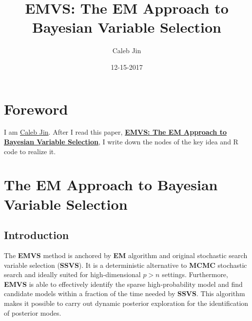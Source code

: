 \documentclass[]{book}
\title{EMVS: The EM Approach to Bayesian Variable Selection}
\author{Caleb Jin}
\date{12-15-2017}
\begin{document}
\maketitle

{
\setcounter{tocdepth}{1}
\tableofcontents
}
\hypertarget{foreword}{%
\chapter{Foreword}\label{foreword}}

I am \href{https://www.sjin.name/}{Caleb Jin}. After I read this paper, \textbf{\href{https://www.tandfonline.com/doi/full/10.1080/01621459.2013.869223}{EMVS: The EM Approach to Bayesian Variable Selection}}\citep{EMVS}, I write down the nodes of the key idea and R code to realize it.

\newcommand\T{{\top}}
\newcommand\ubeta{{\boldsymbol \beta}}
\newcommand\uSigma{{\boldsymbol \Sigma}}
\newcommand\uepsilon{{\boldsymbol \epsilon}}
\newcommand\umu{{\boldsymbol \mu}}
\newcommand\utheta{{\boldsymbol \theta}}
\newcommand\bg{{\boldsymbol \gamma}}
\newcommand\uphi{{\boldsymbol \phi}}
\newcommand\0{{\bf 0}}
\newcommand\uX{{\bf X}}
\newcommand\uD{{\bf D}}
\newcommand\ux{{\bf x}}
\newcommand\uY{{\bf Y}}
\newcommand\uy{{\bf y}}
\newcommand\uz{{\bf z}}
\newcommand\uI{{\bf I}}
\newcommand\uA{{\bf A}}
\newcommand\uB{{\bf B}}
\newcommand\uH{{\bf H}}
\newcommand\uM{{\bf M}}
\newcommand\uV{{\bf V}}
\newcommand\diag{{\rm diag}}

\hypertarget{the-em-approach-to-bayesian-variable-selection}{%
\chapter{The EM Approach to Bayesian Variable Selection}\label{the-em-approach-to-bayesian-variable-selection}}

\hypertarget{introduction}{%
\section{Introduction}\label{introduction}}

The \textbf{EMVS} method is anchored by \textbf{EM} algorithm and original stochastic search variable selection (\textbf{SSVS}). It is a deterministic alternative to \textbf{MCMC} stochastic search and ideally suited for high-dimensional \(p>n\) settings. Furthermore, \textbf{EMVS} is able to effectively identify the sparse high-probability model and find candidate models within a fraction of the time needed by \textbf{SSVS}. This algorithm makes it possible to carry out dynamic posterior exploration for the identification of posterior modes.
\end{document}
